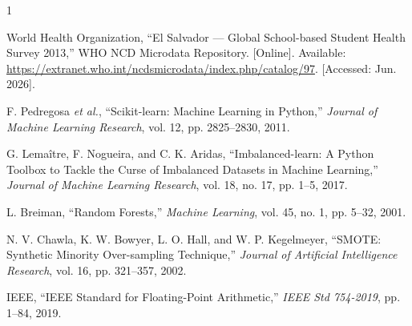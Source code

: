 \documentclass[conference]{IEEEtran}
\begin{document}
\begin{thebibliography}{1}

  World Health Organization, ``El Salvador --- Global School-based Student Health Survey 2013,'' WHO NCD Microdata Repository. [Online]. Available: \url{https://extranet.who.int/ncdsmicrodata/index.php/catalog/97}. [Accessed: Jun. 2026].

  F. Pedregosa \textit{et al.}, ``Scikit-learn: Machine Learning in Python,'' \textit{Journal of Machine Learning Research}, vol. 12, pp. 2825--2830, 2011.

  G. Lema\^{i}tre, F. Nogueira, and C. K. Aridas, ``Imbalanced-learn: A Python Toolbox to Tackle the Curse of Imbalanced Datasets in Machine Learning,'' \textit{Journal of Machine Learning Research}, vol. 18, no. 17, pp. 1--5, 2017.

  L. Breiman, ``Random Forests,'' \textit{Machine Learning}, vol. 45, no. 1, pp. 5--32, 2001.

  N. V. Chawla, K. W. Bowyer, L. O. Hall, and W. P. Kegelmeyer, ``SMOTE: Synthetic Minority Over-sampling Technique,'' \textit{Journal of Artificial Intelligence Research}, vol. 16, pp. 321--357, 2002.

  IEEE, ``IEEE Standard for Floating-Point Arithmetic,'' \textit{IEEE Std 754-2019}, pp. 1--84, 2019.

\end{thebibliography}
\end{document}
